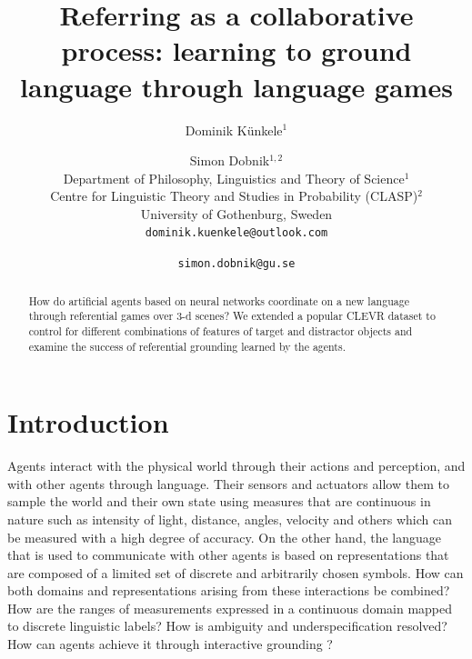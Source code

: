 \documentclass[11pt]{article}
\title{Referring as a collaborative process: learning to ground \\ language through language games} %
\author{Dominik Künkele$^{1}$ \and Simon Dobnik$^{1,2}$ \\
        Department of Philosophy, Linguistics and Theory of Science$^{1}$ \\ 
        Centre for Linguistic Theory and Studies in Probability (CLASP)$^{2}$ \\
        University of Gothenburg, Sweden \\
        \texttt{dominik.kuenkele@outlook.com} \and \texttt{simon.dobnik@gu.se}}
\begin{document}
\maketitle
\begin{abstract}
  How do artificial agents based on neural networks coordinate on a new language through referential games over 3-d scenes?
  We extended a popular CLEVR dataset to control for different combinations of features of target and distractor objects and examine the success of referential grounding learned by the agents.
\end{abstract}

\section{Introduction}

Agents interact with the physical world through their actions and perception, and with other agents through language.
Their sensors and actuators %
allow them to sample the world and their own state using measures that are continuous in nature such as intensity of light, distance, angles, velocity and others which can be measured with a high degree of accuracy.
On the other hand, the language that is used to communicate with other agents is based on representations that are composed of a limited set of discrete and arbitrarily chosen symbols.
How can both domains and representations arising from these interactions be combined? How are the ranges of measurements expressed in a continuous domain mapped to discrete linguistic labels?
How is ambiguity and underspecification resolved?
How can agents achieve it through interactive grounding \citep{Regier:1996,Roy:2005,Cooper:2023aa}?


\end{document}
